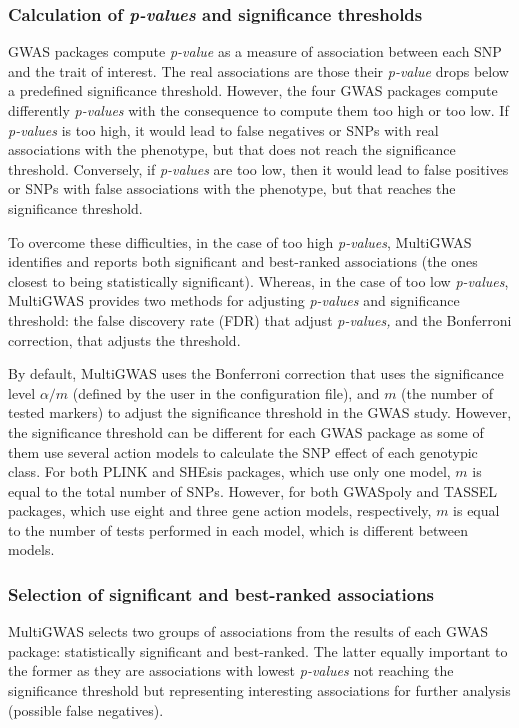 \documentclass{article}
\begin{document}
\subsubsection{Calculation of \emph{p-values }and significance thresholds}

GWAS packages compute \emph{p-value }as a measure of association between each SNP and the trait of interest. The real associations are those their \emph{p-value }drops below a predefined significance threshold. However, the four GWAS packages compute differently \emph{p-values} with the consequence to compute them too high or too low. If \emph{p-values} is too high, it would lead to false negatives or SNPs with real associations with the phenotype, but that does not reach the significance threshold. Conversely, if \emph{p-values} are too low, then it would lead to false positives or SNPs with false associations with the phenotype, but that reaches the significance threshold.

To overcome these difficulties, in the case of too high \emph{p-values}, MultiGWAS identifies and reports both significant and best-ranked associations (the ones closest to being statistically significant). Whereas, in the case of too low \emph{p-values}, MultiGWAS provides two methods for adjusting \emph{p-values} and significance threshold: the false discovery rate (FDR) that adjust \emph{p-values, }and the Bonferroni correction, that adjusts the threshold.

By default, MultiGWAS uses the Bonferroni correction that uses the significance level  $\alpha/m$ (defined by the user in the configuration file), and $m$ (the number of tested markers) to adjust the significance threshold in the GWAS study. However, the significance threshold can be different for each GWAS package as some of them use several action models to calculate the SNP effect of each genotypic class. For both PLINK and SHEsis packages, which use only one model, $m$ is equal to the total number of SNPs. However, for both GWASpoly and TASSEL packages, which use eight and three gene action models, respectively, $m$ is equal to the number of tests performed in each model, which is different between models. 



\subsubsection{Selection of significant and best-ranked associations}\color{black}
MultiGWAS selects two groups of associations from the results of each GWAS package: statistically significant and best-ranked. The latter equally important to the former as they are associations with lowest \emph{p-values} not reaching the significance threshold but representing interesting associations for further analysis (possible false negatives). 
\end{document}
